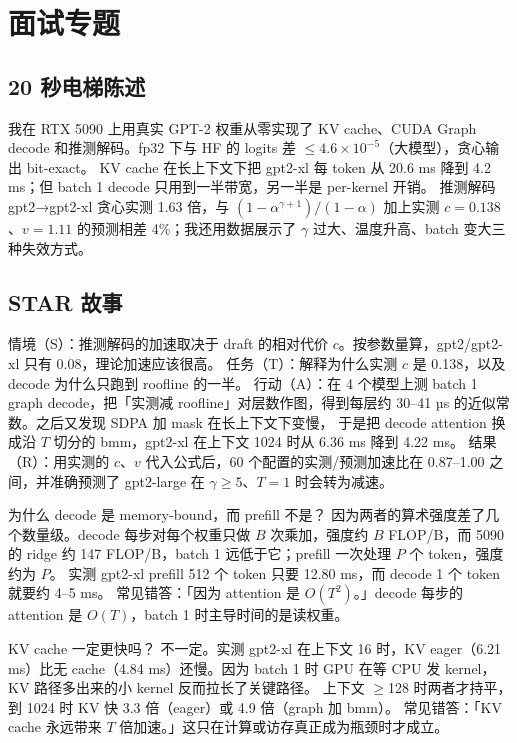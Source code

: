 \documentclass[11pt,a4paper]{ctexart}
\begin{document}
\section{面试专题}

\subsection{20 秒电梯陈述}
我在 RTX 5090 上用真实 GPT-2 权重从零实现了 KV cache、CUDA Graph decode 和推测解码。fp32 下与 HF 的 logits 差 $\le 4.6\times10^{-5}$（大模型），贪心输出 bit-exact。
KV cache 在长上下文下把 gpt2-xl 每 token 从 20.6 ms 降到 4.2 ms；但 batch 1 decode 只用到一半带宽，另一半是 per-kernel 开销。
推测解码 gpt2→gpt2-xl 贪心实测 1.63 倍，与 $(1-\alpha^{\gamma+1})/(1-\alpha)$ 加上实测 $c{=}0.138$、$v{=}1.11$ 的预测相差 4\%；我还用数据展示了 $\gamma$ 过大、温度升高、batch 变大三种失效方式。

\subsection{STAR 故事}
情境（S）：推测解码的加速取决于 draft 的相对代价 $c$。按参数量算，gpt2/gpt2-xl 只有 0.08，理论加速应该很高。
任务（T）：解释为什么实测 $c$ 是 0.138，以及 decode 为什么只跑到 roofline 的一半。
行动（A）：在 4 个模型上测 batch 1 graph decode，把「实测减 roofline」对层数作图，得到每层约 30--41 µs 的近似常数。之后又发现 SDPA 加 mask 在长上下文下变慢，
于是把 decode attention 换成沿 $T$ 切分的 bmm，gpt2-xl 在上下文 1024 时从 6.36 ms 降到 4.22 ms。
结果（R）：用实测的 $c$、$v$ 代入公式后，60 个配置的实测/预测加速比在 0.87--1.00 之间，并准确预测了 gpt2-large 在 $\gamma\ge5$、$T{=}1$ 时会转为减速。

\begin{iqbox}{为什么 decode 是 memory-bound，而 prefill 不是？}
因为两者的算术强度差了几个数量级。decode 每步对每个权重只做 $B$ 次乘加，强度约 $B$ FLOP/B，而 5090 的 ridge 约 147 FLOP/B，batch 1 远低于它；prefill 一次处理 $P$ 个 token，强度约为 $P$。
实测 gpt2-xl prefill 512 个 token 只要 12.80 ms，而 decode 1 个 token 就要约 4--5 ms。
\tcblower
常见错答：「因为 attention 是 $O(T^2)$。」decode 每步的 attention 是 $O(T)$，batch 1 时主导时间的是读权重。
\end{iqbox}

\begin{iqbox}{KV cache 一定更快吗？}
不一定。实测 gpt2-xl 在上下文 16 时，KV eager（6.21 ms）比无 cache（4.84 ms）还慢。因为 batch 1 时 GPU 在等 CPU 发 kernel，KV 路径多出来的小 kernel 反而拉长了关键路径。
上下文 $\ge$128 时两者才持平，到 1024 时 KV 快 3.3 倍（eager）或 4.9 倍（graph 加 bmm）。
\tcblower
常见错答：「KV cache 永远带来 $T$ 倍加速。」这只在计算或访存真正成为瓶颈时才成立。
\end{iqbox}
\end{document}
